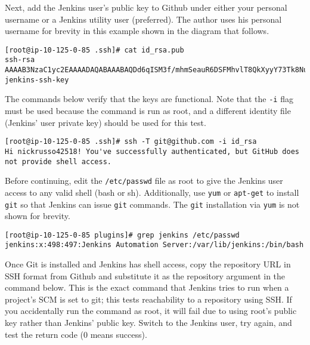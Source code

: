 Next, add the Jenkins user's public key to Github under either your personal
username or a Jenkins utility user (preferred). The author uses his personal
username for brevity in this example shown in the diagram that follows.

\begin{verbatim}
[root@ip-10-125-0-85 .ssh]# cat id_rsa.pub
ssh-rsa AAAAB3NzaC1yc2EAAAADAQABAAABAQDd6qISM3f/mhmSeauR6DSFMhvlT8QkXyyY73Tk8Nuf+SytelhP15gqTao3iA08LlpOBOnvtGXVwHEyQhMu0JTfFwRsTOGRRl3Yp9n6Y2/8AGGNTp+Q4tGpczZkh/Xs7LFyQAK3DIVBBnfF0eOiX20/dC5W72aF3IzZBIsNyc9Bcka8wmVb2gdYkj1nQg6VQI1C6yayLwyjFxEDgArGbWk0Z4GbWqgfJno5gLT844SvWmOWEJ1jNIw1ipoxSioVSSc/rsA0A3e9nWZ/HQGUbbhIOGx7k4ruQLTCPeduU+VgIIj3Iws1tFRwc+lXEn58qicJ6nFlIbAW1kJj8I/+1fEj jenkins-ssh-key
\end{verbatim}


The commands below verify that the keys are functional. Note that the
\verb|-i| flag must be used because the command is run as root, and a
different identity file (Jenkins' user private key) should be used for this test.

\begin{verbatim}
[root@ip-10-125-0-85 .ssh]# ssh -T git@github.com -i id_rsa
Hi nickrusso42518! You've successfully authenticated, but GitHub does not provide shell access.
\end{verbatim}

Before continuing, edit the \verb|/etc/passwd| file as root to give the
Jenkins user access to any valid shell (bash or sh). Additionally, use \verb|yum|
or \verb|apt-get| to install \verb|git| so that Jenkins can issue \verb|git|
commands. The \verb|git| installation via \verb|yum| is not shown for brevity.

\begin{verbatim}
[root@ip-10-125-0-85 plugins]# grep jenkins /etc/passwd
jenkins:x:498:497:Jenkins Automation Server:/var/lib/jenkins:/bin/bash
\end{verbatim}

Once Git is installed and Jenkins has shell access, copy the repository URL in
SSH format from Github and substitute it as the repository argument in the
command below. This is the exact command that Jenkins tries to run when a
project's SCM is set to git; this tests reachability to a repository using
SSH\@. If you accidentally run the command as root, it will fail due to using
root's public key rather than Jenkins' public key. Switch to the Jenkins user,
try again, and test the return code (0 means success).

